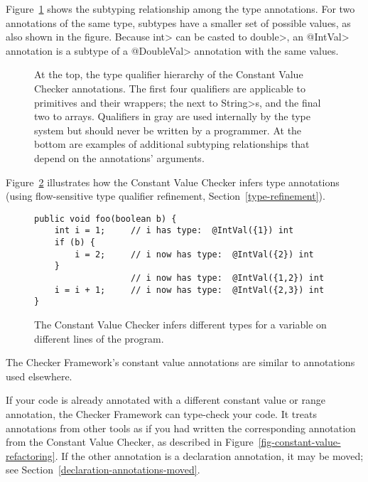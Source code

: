 Figure~\ref{fig-value-hierarchy} shows the
subtyping relationship among the type annotations.
For two annotations of the same type, subtypes have a smaller set of
possible values, as also shown in the figure.
Because \<int> can be casted to \<double>, an \<@IntVal> annotation is a
subtype of a \<@DoubleVal> annotation with the same values.

\begin{figure}
\caption{At the top, the type qualifier hierarchy of the Constant Value Checker
  annotations.
  The first four qualifiers are applicable to primitives and their
  wrappers; the next to \<String>s, and the final two to arrays.
Qualifiers in gray are used
internally by the type system but should never be written by a
programmer.  At the bottom are examples of additional subtyping
relationships that depend on the annotations' arguments.}
\label{fig-value-hierarchy}
\end{figure}

Figure~\ref{fig-value-multivalue} illustrates how the Constant Value Checker
infers type annotations (using flow-sensitive type qualifier refinement, Section~\ref{type-refinement}).

\begin{figure}
\begin{Verbatim}
public void foo(boolean b) {
    int i = 1;     // i has type:  @IntVal({1}) int
    if (b) {
        i = 2;     // i now has type:  @IntVal({2}) int
    }
                   // i now has type:  @IntVal({1,2}) int
    i = i + 1;     // i now has type:  @IntVal({2,3}) int
}
\end{Verbatim}
\caption{The Constant Value Checker infers different types
  for a variable on different lines of the program.}
\label{fig-value-multivalue}
\end{figure}



The Checker Framework's constant value annotations are similar to annotations used
elsewhere.

If your code is already annotated with a different constant value or range
annotation, the Checker Framework can type-check your code.
It treats annotations from other tools
as if you had written the corresponding annotation from the
Constant Value Checker, as described in Figure~\ref{fig-constant-value-refactoring}.
If the other annotation is a declaration annotation, it may be moved; see
Section~\ref{declaration-annotations-moved}.


